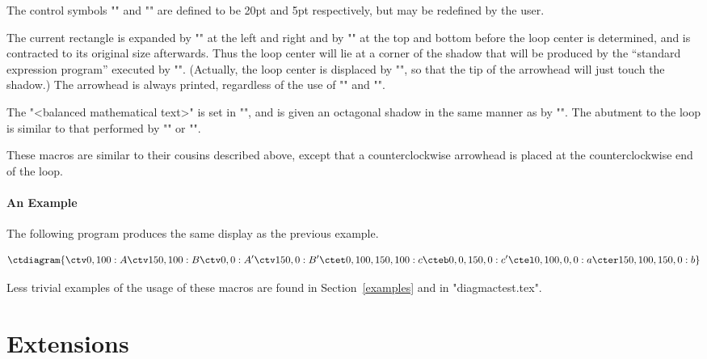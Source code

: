 \documentclass[11pt]{article}
\begin{document}
The control symbols "\ctloopdiameter" and "\ctabutcircledisp" are defined to be
20pt and 5pt respectively, but may be redefined by the user.

The current rectangle is expanded by "\ctvertexborderlr" at the left and right
and by "\ctvertexbordertb" at the top and bottom before the loop center
is determined, and is contracted to its original size afterwards.  Thus
the loop center will lie at a corner of the shadow that will be produced
by the ``standard expression program'' executed by "\ctvg". (Actually, the
loop center is displaced by "\circleheaddisp", so that the tip of the
arrowhead will just touch the shadow.)  The arrowhead is always printed,
regardless of the use of "\cthead" and "\ctnohead".

The "<balanced mathematical text>" is set in "\ctabutstyle", and is given an
octagonal shadow in the same manner as by "\ctetg".  The abutment to the loop
is similar to that performed by "\abutcircleleft" or "\abutcircleright".
\begin{myverb}



\end{myverb}
These macros are similar to their cousins described above, except that a
counterclockwise arrowhead is placed at the counterclockwise end of the loop.

\paragraph{An Example}

The following program produces the same display as the previous
example.
\begin{myverb}
    \[
    \ctdiagram{
      \ctv 0,100:{A}
      \ctv 150,100:{B}
      \ctv 0,0:{A'}
      \ctv 150,0:{B'}
      \ctet 0,100,150,100:{c}
      \cteb 0,0,150,0:{c'}
      \ctel 0,100,0,0:{a}
      \cter 150,100,150,0:{b}
    }
    \]
\end{myverb}
Less trivial examples of the usage of these macros are found in Section~\ref{examples} and
in "diagmactest.tex".

\cleardoublepage
\section{Extensions}
\label{extensions}
\end{document}
